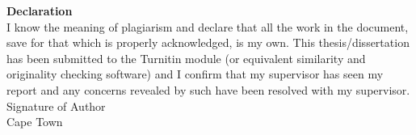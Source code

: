 {
  \makeatletter
    \thispagestyle{empty}
    \renewcommand{\thefootnote}{}
    \vspace*{3cm}
    \noindent \large \textbf{\Huge Declaration}
    \\[2cm]
    \noindent I know the meaning of plagiarism and declare that all the work in the document, save for that which is properly acknowledged, is my own. This thesis/dissertation has been submitted to the Turnitin module (or  equivalent similarity and originality checking software) and I confirm that my supervisor has seen my report and any concerns revealed by such have been resolved with my supervisor.
    \vspace{15mm}
    \vspace{15mm}\\
    \noindent Signature of Author \dotfill \\
    \noindent Cape Town \\
    \noindent \@date
    
  \makeatother
  \clearpage
}
